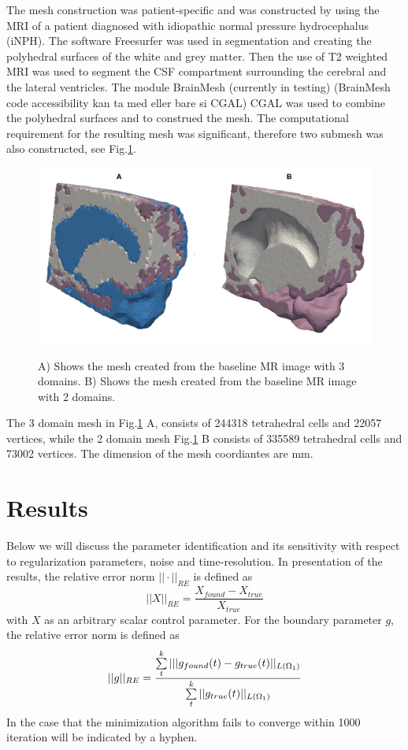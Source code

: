 \documentclass[11pt,a4paper]{article}
\begin{document}
The mesh construction was patient-specific and was constructed by using the MRI of a patient diagnosed with idiopathic normal pressure hydrocephalus (iNPH). The software Freesurfer was used in segmentation and creating the polyhedral surfaces of the white and grey matter. Then the use of T2 weighted MRI was used to segment the CSF compartment surrounding the cerebral and the lateral ventricles. The module BrainMesh (currently in testing) (BrainMesh code accessibility {\color{red} kan ta med eller bare si CGAL}) CGAL \cite{cgal:rty-m3-18b} was used to combine the polyhedral surfaces and to construed the mesh. The computational requirement for the resulting mesh was significant, therefore two submesh was also constructed, see Fig.\ref{Fig::Mesh}.
\begin{figure}
\centering
\includegraphics[scale=0.2]{mesh.png} 
\label{figmesh} 
\caption{A) Shows the mesh created from the baseline MR image with 3 domains. B) Shows the mesh created from the baseline MR image with 2 domains.  }
\label{Fig::Mesh}
\end{figure}
The 3 domain mesh in Fig.\ref{Fig::Mesh} A, consists of 244318 tetrahedral cells and 22057 vertices, while the 2 domain mesh Fig.\ref{Fig::Mesh} B consists of 335589 tetrahedral cells and 73002 vertices. The dimension of the mesh coordiantes are $\mathrm{mm}$.




\section{Results}
Below we will discuss the parameter identification and its sensitivity with respect to regularization parameters, noise and time-resolution. 
In presentation of the results, the relative error norm  $||\cdot||_{RE}$ is defined as 
\begin{equation}
|| X ||_{RE} = \frac{X_{found} -X_{true} }{ X_{true} }
\end{equation}
with $X$ as an arbitrary scalar control parameter. For the boundary parameter $g$, the relative error norm is defined as 
\begin{equation}
|| g ||_{RE} = \frac{ \sum\limits_t\sp{k}||| g_{found}(t) -g_{true}(t)||_{L(\Omega_1)} }{  \sum\limits_t\sp{k}||g_{true}(t)||_{L(\Omega_1)} }
\end{equation}
In the case that the minimization algorithm fails to converge within 1000 iteration will be indicated by a hyphen.  
\end{document}
